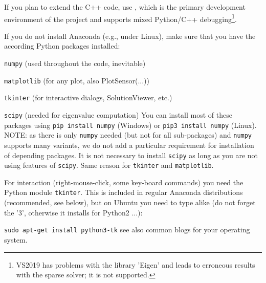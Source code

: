 \noindent If you plan to extend the C++ code, use , which is
the primary development environment of the project and supports mixed Python/C++
debugging\footnote{VS2019 has problems with the library 'Eigen' and leads to erroneous results
with the sparse solver; it is not supported.}.

If you do not install Anaconda (e.g., under Linux), make sure that you have the according Python packages installed:
\bi
  \item \texttt{numpy} (used throughout the code, inevitable)
  \item \texttt{matplotlib} (for any plot, also PlotSensor(...))
  \item \texttt{tkinter} (for interactive dialogs, SolutionViewer, etc.)
  \item \texttt{scipy} (needed for eigenvalue computation)
\ei
You can install most of these packages using \texttt{pip install numpy} (Windows) or \texttt{pip3 install numpy} (Linux).
NOTE: as there is only \texttt{numpy} needed (but not for all sub-packages) and \texttt{numpy} supports many variants, we do not add a particular requirement for installation of depending packages. It is not necessary to install \texttt{scipy} as long as you are not using features of \texttt{scipy}. Same reason for \texttt{tkinter} and \texttt{matplotlib}.

For interaction (right-mouse-click, some key-board commands) you need the Python module \texttt{tkinter}. This is included in regular Anaconda distributions (recommended, see below), but on Ubuntu you need to type alike (do not forget the '3', otherwise it installs for Python2 ...):
\bi
  \item[] \texttt{sudo apt-get install python3-tk}
\ei
see also common blogs for your operating system.

